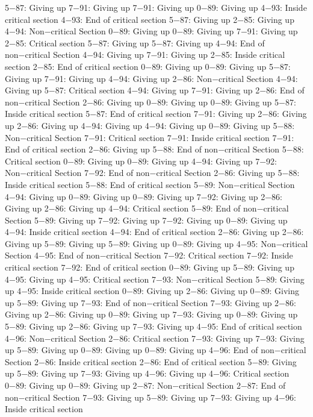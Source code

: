 5−87: Giving up
7−91: Giving up
7−91: Giving up
0−89: Giving up
4−93: Inside critical section
4−93: End of critical section
5−87: Giving up
2−85: Giving up
4−94: Non−critical Section
0−89: Giving up
0−89: Giving up
7−91: Giving up
2−85: Critical section
5−87: Giving up
5−87: Giving up
4−94: End of non−critical Section
4−94: Giving up
7−91: Giving up
2−85: Inside critical section
2−85: End of critical section
0−89: Giving up
0−89: Giving up
5−87: Giving up
7−91: Giving up
4−94: Giving up
2−86: Non−critical Section
4−94: Giving up
5−87: Critical section
4−94: Giving up
7−91: Giving up
2−86: End of non−critical Section
2−86: Giving up
0−89: Giving up
0−89: Giving up
5−87: Inside critical section
5−87: End of critical section
7−91: Giving up
2−86: Giving up
2−86: Giving up
4−94: Giving up
4−94: Giving up
0−89: Giving up
5−88: Non−critical Section
7−91: Critical section
7−91: Inside critical section
7−91: End of critical section
2−86: Giving up
5−88: End of non−critical Section
5−88: Critical section
0−89: Giving up
0−89: Giving up
4−94: Giving up
7−92: Non−critical Section
7−92: End of non−critical Section
2−86: Giving up
5−88: Inside critical section
5−88: End of critical section
5−89: Non−critical Section
4−94: Giving up
0−89: Giving up
0−89: Giving up
7−92: Giving up
2−86: Giving up
2−86: Giving up
4−94: Critical section
5−89: End of non−critical Section
5−89: Giving up
7−92: Giving up
7−92: Giving up
0−89: Giving up
4−94: Inside critical section
4−94: End of critical section
2−86: Giving up
2−86: Giving up
5−89: Giving up
5−89: Giving up
0−89: Giving up
4−95: Non−critical Section
4−95: End of non−critical Section
7−92: Critical section
7−92: Inside critical section
7−92: End of critical section
0−89: Giving up
5−89: Giving up
4−95: Giving up
4−95: Critical section
7−93: Non−critical Section
5−89: Giving up
4−95: Inside critical section
0−89: Giving up
2−86: Giving up
0−89: Giving up
5−89: Giving up
7−93: End of non−critical Section
7−93: Giving up
2−86: Giving up
2−86: Giving up
0−89: Giving up
7−93: Giving up
0−89: Giving up
5−89: Giving up
2−86: Giving up
7−93: Giving up
4−95: End of critical section
4−96: Non−critical Section
2−86: Critical section
7−93: Giving up
7−93: Giving up
5−89: Giving up
0−89: Giving up
0−89: Giving up
4−96: End of non−critical Section
2−86: Inside critical section
2−86: End of critical section
5−89: Giving up
5−89: Giving up
7−93: Giving up
4−96: Giving up
4−96: Critical section
0−89: Giving up
0−89: Giving up
2−87: Non−critical Section
2−87: End of non−critical Section
7−93: Giving up
5−89: Giving up
7−93: Giving up
4−96: Inside critical section
